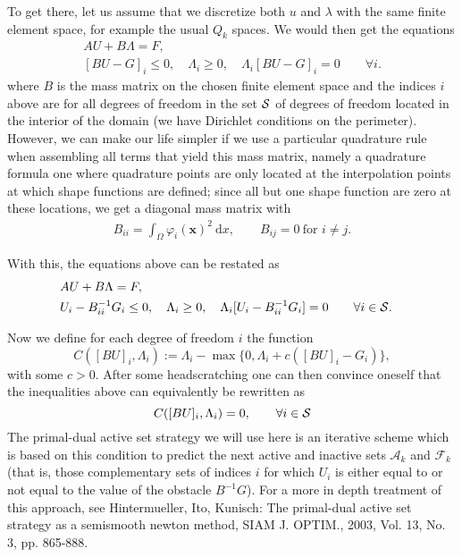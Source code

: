 \documentclass{article}
\begin{document}
To get there, let us assume that we discretize both $u$ and $\lambda$ with the
same finite element space, for example the usual $Q_k$ spaces. We would then
get the equations
\begin{eqnarray*}
 &A U + B\Lambda = F,&\\
 &[BU-G]_i \le 0, \quad \Lambda_i \geq 0,\quad \Lambda_i[BU-G]_i = 0
\qquad \forall i.&
\end{eqnarray*}
where $B$ is the mass matrix on the chosen finite element space and the
indices $i$ above are for all degrees of freedom in the set $\cal S$ of degrees of
freedom located in the interior of the domain
(we have Dirichlet conditions on the perimeter). However, we
can make our life simpler if we use a particular quadrature rule when
assembling all terms that yield this mass matrix, namely a quadrature formula
one where quadrature points are only located at the interpolation points at
which shape functions are defined; since all but one shape function are zero
at these locations, we get a diagonal mass matrix with
\begin{align*}
  B_{ii} = \int_\Omega \varphi_i(\mathbf x)^2\ \textrm{d}x,
  \qquad
  B_{ij}=0 \ \text{for } i\neq j.
\end{align*}

With this, the equations above can be restated as
\begin{eqnarray*}
 &A U + B\Lambda = F,&\\
 &U_i-B_{ii}^{-1}G_i \le 0, \quad \Lambda_i \geq 0,\quad \Lambda_i[U_i-B_{ii}^{-1}G_i] = 0
\qquad \forall i\in{\cal S}.&
\end{eqnarray*}

Now we define for each degree of freedom $i$ the function
\begin{equation*}
 C([BU]_i,\Lambda_i):=\Lambda_i - \max\lbrace 0, \Lambda_i + c([BU]_i - G_i) \rbrace,
\end{equation*}
with some $c>0$.
After some headscratching one can then convince oneself that the inequalities
above can equivalently be rewritten as
\begin{equation*}
 C([BU]_i,\Lambda_i) = 0, \qquad \forall i\in{\cal S}
\end{equation*}
The primal-dual active set strategy we will use here is an iterative scheme which is based on
this condition to predict the next active and inactive sets $\mathcal{A}_k$ and
$\mathcal{F}_k$ (that is, those complementary sets of indices $i$ for which
$U_i$ is either equal to or not equal to the value of the obstacle
$B^{-1}G$). For a more in depth treatment of this approach, see Hintermueller, Ito, Kunisch: The primal-dual active set
strategy as a semismooth newton method, SIAM J. OPTIM., 2003, Vol. 13, No. 3,
pp. 865-888.
\end{document}
